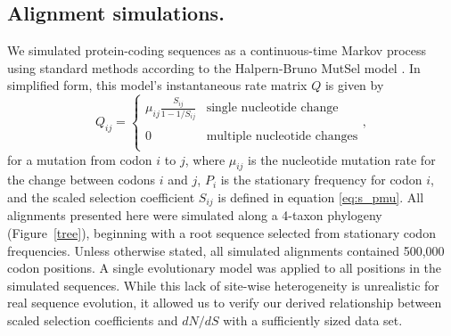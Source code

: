 \documentclass[11pt]{article}
\begin{document}
\subsection*{Alignment simulations.}
We simulated protein-coding sequences as a continuous-time Markov process using standard methods \cite{Yang2006} according to the Halpern-Bruno MutSel model \cite{HalpernBruno1998}. In simplified form, this model's instantaneous rate matrix $Q$ is given by
\begin{equation}\label{eq:HBmatrix}
Q_{ij} = \left\{ 
\begin{array}{rl}
\mu_{ij} \frac{S_{ij}}{1-1/S_{ij}} &\mbox{single nucleotide change} \\\\
0                                  &\mbox{multiple nucleotide changes} \\             
\end{array} \right.,
\end{equation} for a mutation from codon $i$ to $j$, where $\mu_{ij}$ is the nucleotide mutation rate for the change between codons $i$ and $j$, $P_i$ is the stationary frequency for codon $i$, and the scaled selection coefficient $S_{ij}$ is defined in equation \eqref{eq:s_pmu}. All alignments presented here were simulated along a 4-taxon phylogeny (Figure~\ref{tree}), beginning with a root sequence selected from stationary codon frequencies. Unless otherwise stated, all simulated alignments contained 500,000 codon positions. A single evolutionary model was applied to all positions in the simulated sequences. While this lack of site-wise heterogeneity is unrealistic for real sequence evolution, it allowed us to verify our derived relationship between scaled selection coefficients and $dN/dS$ with a sufficiently sized data set.

	
\end{document}
